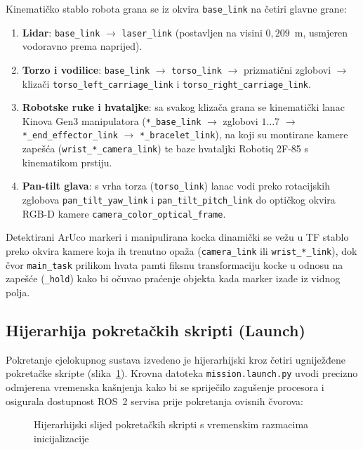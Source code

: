Kinematičko stablo robota grana se iz okvira \texttt{base\_link} na četiri glavne grane:
\begin{enumerate}
  \item \textbf{Lidar}: \texttt{base\_link} $\rightarrow$ \texttt{laser\_link} (postavljen na visini $0{,}209$~m, usmjeren vodoravno prema naprijed).
  \item \textbf{Torzo i vodilice}: \texttt{base\_link} $\rightarrow$ \texttt{torso\_link} $\rightarrow$ prizmatični zglobovi $\rightarrow$ klizači \texttt{torso\_left\_carriage\_link} i \texttt{torso\_right\_carriage\_link}.
  \item \textbf{Robotske ruke i hvataljke}: sa svakog klizača grana se kinematički lanac Kinova Gen3 manipulatora (\texttt{*\_base\_link} $\rightarrow$ zglobovi $1\dots7$ $\rightarrow$ \texttt{*\_end\_effector\_link} $\rightarrow$ \texttt{*\_bracelet\_link}), na koji su montirane kamere zapešća (\texttt{wrist\_*\_camera\_link}) te baze hvataljki Robotiq 2F-85 s kinematikom prstiju.
  \item \textbf{Pan-tilt glava}: s vrha torza (\texttt{torso\_link}) lanac vodi preko rotacijskih zglobova \texttt{pan\_tilt\_yaw\_link} i \texttt{pan\_tilt\_pitch\_link} do optičkog okvira RGB-D kamere \texttt{camera\_color\_optical\_frame}.
\end{enumerate}
Detektirani ArUco markeri i manipulirana kocka dinamički se vežu u TF stablo preko okvira kamere koja
ih trenutno opaža (\texttt{camera\_link} ili \texttt{wrist\_*\_link}), dok čvor \texttt{main\_task}
prilikom hvata pamti fiksnu transformaciju kocke u odnosu na zapešće (\texttt{\_hold}) kako bi
očuvao praćenje objekta kada marker izađe iz vidnog polja.

\subsection{Hijerarhija pokretačkih skripti (Launch)}
\label{sec:02-launch}

Pokretanje cjelokupnog sustava izvedeno je hijerarhijski kroz četiri ugniježđene pokretačke skripte
(slika~\ref{fig:launch-hijerarhija}). Krovna datoteka \texttt{mission.launch.py} uvodi precizno
odmjerena vremenska kašnjenja kako bi se spriječilo zagušenje procesora i osigurala dostupnost
ROS~2 servisa prije pokretanja ovisnih čvorova:

\begin{figure}[H]
  \centering
  
  \caption{Hijerarhijski slijed pokretačkih skripti s vremenskim razmacima inicijalizacije}
  \label{fig:launch-hijerarhija}
\end{figure}

